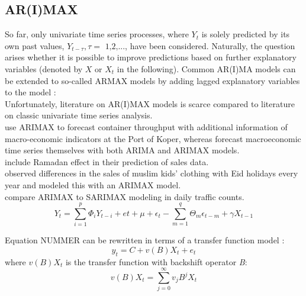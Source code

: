 \documentclass[a4paper, 11pt]{article}
\begin{document}
\subsection{AR(I)MAX}
 
So far, only univariate time series processes, where $Y_{t}$ is solely predicted by its own past values, $Y_{t-\tau}, \tau = \text{ 1,2,...}$, have been considered. Naturally, the question arises whether it is possible to improve predictions based on further explanatory variables (denoted by $X$ or $X_{t}$ in the following). Common AR(I)MA models can be extended to so-called ARMAX models by adding lagged explanatory variables to the model \citep{Andreoni.2006b}:
\\

Unfortunately, literature on AR(I)MAX models is scarce compared to literature on classic univariate time series analysis.\\
\cite{Intihar.2017} use ARIMAX to forecast container throughput with additional information of macro-economic indicators at the Port of Koper, whereas \cite{Durka.2012} forecast macroeconomic time series themselves with both ARIMA and ARIMAX models.\\
\cite{Lee.2010} include Ramadan effect in their prediction of sales data. \\
\cite{Anggraeni.2015} observed differences in the sales of muslim kids' clothing with Eid holidays every year and modeled this with an ARIMAX model. \\
\cite{Cools.2009} compare ARIMAX to SARIMAX modeling in daily traffic counts. \\


\begin{equation}
Y_{t} = \sum_{i = 1}^{p}\Phi_{i}Y_{t-i} + e{t} + \mu + \epsilon_{t} - \sum_{m = 1}^{q} \Theta_{m}\epsilon_{t-m} + \gamma X_{t-1} 
\end{equation}

Equation NUMMER can be rewritten in terms of a transfer function model \citep{Durka.2012}:
\begin{equation}
y_{t} = C + v(B)X_{t} + e_{t}
\end{equation}
where $v(B)X_{t}$ is the transfer function with backshift operator \textit{B}:
\begin{equation}
	v(B)X_{t} = \sum_{j = 0}^{\infty} v_{j}B^{j}X_{t}
\end{equation}
\end{document}
